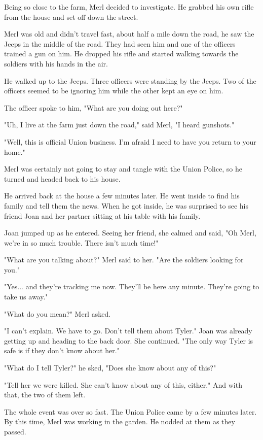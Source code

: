 \documentclass[courier]{sffms}
\begin{document}
Being so close to the farm, Merl decided to
investigate. He grabbed his own rifle from the
house and set off down the street.

Merl was old and didn't travel fast, about half a mile
down the road, he saw the Jeeps in the middle of 
the road. They had seen him and one of the officers
trained a gun on him. He dropped his rifle and
started walking towards the soldiers with his hands
in the air.

He walked up to the Jeeps. Three officers were standing
by the Jeeps. Two of the officers seemed to be ignoring
him while the other kept an eye on him.

The officer spoke to him, "What are you doing out here?"

"Uh, I live at the farm just down the road,"
said Merl, "I heard gunshots."

"Well, this is official Union business. I'm afraid I need
to have you return to your home."

Merl was certainly not going to stay and tangle with
the Union Police, so he turned and headed back to
his house.

He arrived back at the house a few minutes later.
He went inside to find his family and tell them the
news. When he got inside, he was surprised to see
his friend Joan and her partner sitting at his table
with his family.

Joan jumped up as he entered. Seeing her friend,
she calmed and said, "Oh Merl, we're in so much
trouble. There isn't much time!"

"What are you talking about?" Merl said to her.
"Are the soldiers looking for you."

"Yes... and they're tracking me now. They'll be here
any minute. They're going to take us away."

"What do you mean?" Merl asked.

"I can't explain. We have to go. Don't tell them
about Tyler." Joan was already getting up and heading
to the back door. She continued. "The only way
Tyler is safe is if they don't know about her."

"What do I tell Tyler?" he sked, "Does she know 
about any of this?"

"Tell her we were killed. She can't know about
any of this, either." And with that, the two of them
left.

The whole event was over so fast. The Union Police
came by a few minutes later. By this time, Merl was
working in the garden. He nodded at them as they
passed.
\end{document}
